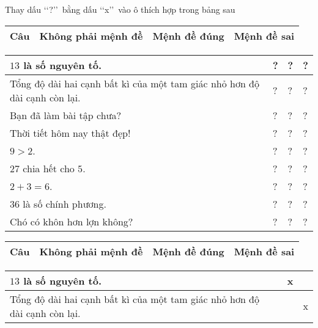 \begin{vd}%
	Thay dấu \lq\lq ?\rq\rq\ bằng dấu \lq\lq  x\rq\rq\ vào ô thích hợp trong bảng sau
	\begin{center}
		\begin{tabular}{|>{\centering\arraybackslash}m{5.5cm}|>{\centering\arraybackslash}m{2cm}|>{\centering\arraybackslash}m{2cm}|>{\centering\arraybackslash}m{2cm}|}
			\hline
			Câu & Không phải mệnh đề & Mệnh đề đúng & Mệnh đề sai \\
			\hline
		\end{tabular}
		\begin{tabular}{|>{\raggedright\arraybackslash}m{5.5cm}|>{\centering\arraybackslash}m{2cm}|>{\centering\arraybackslash}m{2cm}|>{\centering\arraybackslash}m{2cm}|}
			$13$ là số nguyên tố. & ? & ? & ? \\
			\hline
			Tổng độ dài hai cạnh bất kì của một tam giác nhỏ hơn độ dài cạnh còn lại. & ? & ? & ? \\
			\hline
			Bạn đã làm bài tập chưa? & ? & ? & ? \\
			\hline
			Thời tiết hôm nay thật đẹp! & ? & ? & ? \\
			\hline
			$9>2$. & ? & ? & ? \\
			\hline
			$27$ chia hết cho $5$. & ? & ? & ? \\
			\hline
			$2+3=6$. & ? & ? & ? \\
			\hline
			$36$ là số chính phương. & ? & ? & ? \\
			\hline
			Chó có khôn hơn lợn không? & ? & ? & ? \\
			\hline
		\end{tabular}
	\end{center}
	\loigiai
	{
		\begin{center}
			\begin{tabular}{|>{\centering\arraybackslash}m{5.5cm}|>{\centering\arraybackslash}m{2cm}|>{\centering\arraybackslash}m{2cm}|>{\centering\arraybackslash}m{2cm}|}
				\hline
				Câu & Không phải mệnh đề & Mệnh đề đúng & Mệnh đề sai \\
				\hline
			\end{tabular}
			\begin{tabular}{|>{\raggedright\arraybackslash}m{5.5cm}|>{\centering\arraybackslash}m{2cm}|>{\centering\arraybackslash}m{2cm}|>{\centering\arraybackslash}m{2cm}|}
				$13$ là số nguyên tố. &  & x &  \\
				\hline
				Tổng độ dài hai cạnh bất kì của một tam giác nhỏ hơn độ dài cạnh còn lại. &  &  & x \\

\end{tabular}
\end{center}}
\end{vd}
